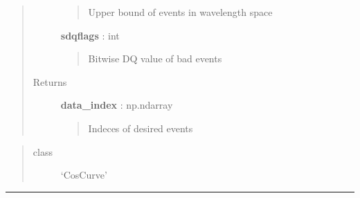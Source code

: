 \documentclass[letterpaper,10pt,english]{sphinxmanual}
\begin{document}
\begin{fulllineitems}
\begin{quote}
\begin{description}
\begin{quote}
Upper bound of events in wavelength space
\end{quote}

\textbf{sdqflags} : int
\begin{quote}

Bitwise DQ value of bad events
\end{quote}

\item[{Returns }] \leavevmode
\textbf{data\_index} : np.ndarray
\begin{quote}

Indeces of desired events
\end{quote}

\end{description}\end{quote}

\end{fulllineitems}

\begin{quote}\begin{description}
\item[{class}] \leavevmode
`CosCurve'

\end{description}\end{quote}


\bigskip\hrule{}\bigskip

\end{document}
